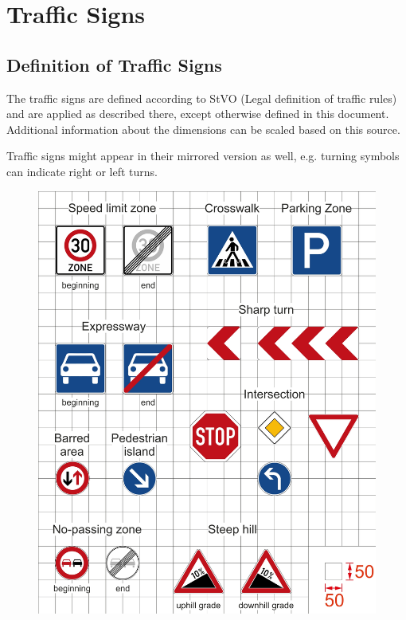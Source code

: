 \section{Traffic Signs}
\label{fig_traffic_signs}
\subsection{Definition of Traffic Signs}
The traffic signs are defined according to StVO (Legal definition of traffic
rules) and are applied as described there, except otherwise defined in this
document. Additional information about the dimensions can be scaled based on
this source.

Traffic signs might appear in their mirrored version as well, e.g. turning
symbols can indicate right or left turns.

\begin{figure}[H]
	\begin{center}
		\centering\includegraphics[]{graphics/Abb_18_traffic_signs.jpg}
	\end{center}
\end{figure}

